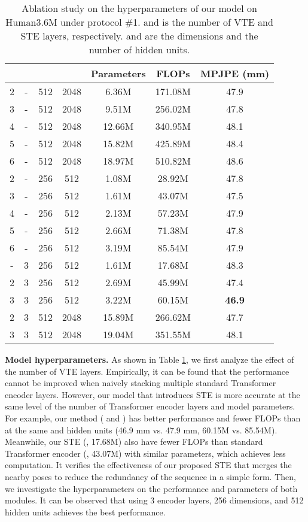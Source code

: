 \documentclass[10pt,twocolumn,letterpaper]{article}
\begin{document}
\begin{table}[t]
   \centering
   \small
   \setlength{\tabcolsep}{1.6mm} 
   \begin{tabular}{ccccccc}
     \toprule  [1pt]
      & & & &Parameters &FLOPs &MPJPE (mm)\\
      \midrule  [0.5pt]
      2 &- &512 &2048 &6.36M &171.08M  &47.9 \\
      3 &- &512 &2048 &9.51M &256.02M  &47.8 \\
      4 &- &512 &2048 &12.66M &340.95M &48.1 \\
      5 &- &512 &2048 &15.82M &425.89M &48.4 \\
      6 &- &512 &2048 &18.97M &510.82M &48.6 \\
      \midrule [0.5pt]  

      2 &- &256 &512 &1.08M &28.92M &47.8 \\
      3 &- &256 &512 &1.61M &43.07M &47.5 \\
      4 &- &256 &512 &2.13M &57.23M &47.9 \\
      5 &- &256 &512 &2.66M &71.38M &47.8 \\
      6 &- &256 &512 &3.19M &85.54M &47.9 \\
      \midrule [0.5pt]  

      - &3 &256 &512 &1.61M &17.68M &48.3 \\
      2 &3 &256 &512 &2.69M &45.99M &47.4 \\
      3 &3 &256 &512 &3.22M &60.15M &\textbf{46.9} \\
      2 &3 &512 &2048 &15.89M &266.62M &47.7 \\
      3 &3 &512 &2048 &19.04M &351.55M &48.1 \\
      \toprule  [1.0pt] 

   \end{tabular}
     \caption
     {
      Ablation study on the hyperparameters of our model on Human3.6M under protocol \#1. 
       and  is the number of VTE and STE layers, respectively. 
       and  are the dimensions and the number of hidden units. 
     }
   \label{table:hyperparameters}
 \end{table}

\textbf{Model hyperparameters. }
As shown in Table \ref{table:hyperparameters}, we first analyze the effect of the number of VTE layers. 
Empirically, it can be found that the performance cannot be improved when naively stacking multiple standard Transformer encoder layers. 
However, our model that introduces STE is more accurate at the same level of the number of Transformer encoder layers and model parameters. 
For example, our method ( and ) has better performance and fewer FLOPs than  at the same  and  hidden units (46.9 mm vs. 47.9 mm, 60.15M vs. 85.54M). 
Meanwhile, our STE (, 17.68M) also have fewer FLOPs than standard Transformer encoder (, 43.07M) with similar parameters, which achieves  less computation. 
It verifies the effectiveness of our proposed STE that merges the nearby poses to reduce the redundancy of the sequence in a simple form. 
Then, we investigate the hyperparameters 
on the performance and parameters of both modules. 
It can be observed that using 3 encoder layers, 256 dimensions, and 512 hidden units achieves the best performance. 
\end{document}
